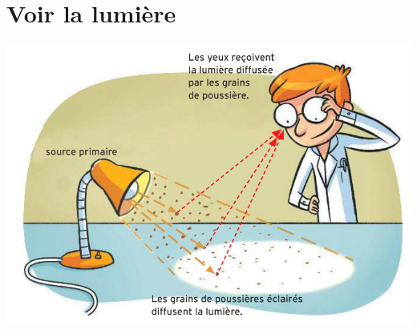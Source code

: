 \documentclass[xcolor={dvipsnames}]{beamer}
\begin{document}
\section{Voir la lumière}

\begin{frame}
	
\end{frame}


\begin{frame}
	
	
	\begin{center}
		\includegraphics[scale=0.35]{bilan3}
	\end{center}
\end{frame}

%
%	
%
%
%	
\end{document}
